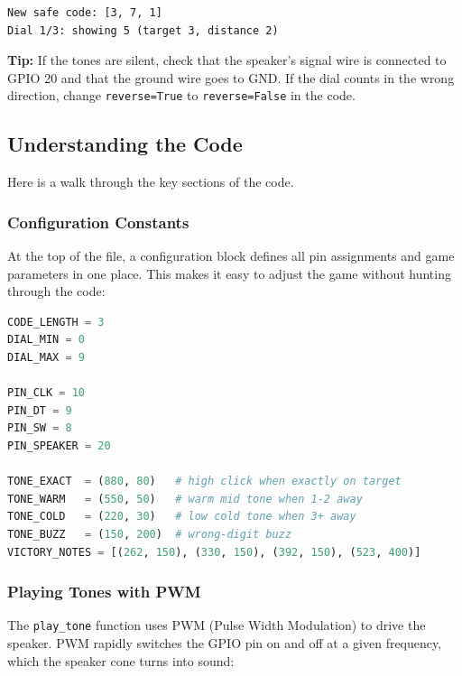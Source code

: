 \begin{verbatim}
New safe code: [3, 7, 1]
Dial 1/3: showing 5 (target 3, distance 2)
\end{verbatim}

\begin{tcolorbox}[colback=green!5!white,colframe=green!40!black]
    \textbf{Tip:} If the tones are silent, check that the speaker's signal wire is connected
    to GPIO 20 and that the ground wire goes to GND. If the dial counts in the wrong direction,
    change \texttt{reverse=True} to \texttt{reverse=False} in the code.
\end{tcolorbox}

\subsection{Understanding the Code}

Here is a walk through the key sections of the code.

\subsubsection{Configuration Constants}

At the top of the file, a configuration block defines all pin assignments and game parameters
in one place. This makes it easy to adjust the game without hunting through the code:

\begin{lstlisting}[language=Python, caption=Configuration constants]
CODE_LENGTH = 3
DIAL_MIN = 0
DIAL_MAX = 9

PIN_CLK = 10
PIN_DT = 9
PIN_SW = 8
PIN_SPEAKER = 20

TONE_EXACT  = (880, 80)   # high click when exactly on target
TONE_WARM   = (550, 50)   # warm mid tone when 1-2 away
TONE_COLD   = (220, 30)   # low cold tone when 3+ away
TONE_BUZZ   = (150, 200)  # wrong-digit buzz
VICTORY_NOTES = [(262, 150), (330, 150), (392, 150), (523, 400)]
\end{lstlisting}

\subsubsection{Playing Tones with PWM}

The \texttt{play\_tone} function uses PWM (Pulse Width Modulation) to drive the speaker.
PWM rapidly switches the GPIO pin on and off at a given frequency, which the speaker cone
turns into sound:

